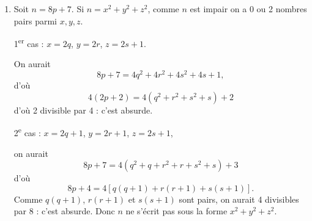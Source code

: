 \begin{enumerate}[label=\arabic*.,leftmargin=2.2em,itemsep=1.2em]
On considère
\[
u_n=1+\frac12+\frac13+\cdots+\frac1n
=\frac1{n!}\sum_{j=1}^{n}\frac{n!}{j}.
\]
On écrit chaque $j\le n$ sous la forme $j=A_j2^{\alpha_j}$, $A_j$ impair, et on écrit aussi $n!$ en $n!=A2^p$ avec $A$ impair. On a
\[
u_n=\frac1{A2^p}\sum_{j=1}^{n}\frac A{A_j}2^{p-\alpha_j}.
\]
Puis, pour $j\le n$, comme $j$ divise $n!$, c'est que $A_j$, impair, divise $A2^p$, donc que $A_j$ divise $A$ ; et pour $j=2^q$, on a $A_{2^q}=1$, (et $\alpha_{2^q}=q$). On isole ce terme, d'où
\[
u_n=\frac1{A2^p}
\left(
\sum_{\substack{1\le j\le n\\j\ne2^q}}\frac A{A_j}2^{p-\alpha_j}+A2^{p-q}
\right).
\]
On a justifié que, pour $j\le n$, avec $j\ne2^q$, $\alpha_j\le q-1$, donc $p-\alpha_j>p-q$ : on peut « simplifier » par $2^{p-q}$ l'expression de $u_n$ qui devient :
\[
u_n=\frac1{A2^q}
\left(
\sum_{\substack{1\le j\le n\\j\ne2^q}}\frac A{A_j}2^{q-\alpha_j}+A
\right).
\]
Comme $A/A_j$ est entier, que $q-\alpha_j\ge1$ pour $j\ne2^q$ et que $A$ est impair, l'entier
\[
\sum_{\substack{1\le j\le n\\j\ne2^q}}\frac A{A_j}2^{q-\alpha_j}+A
\]
est impair, si on le note $2a+1$, on a
\[
u_n=\frac{2a+1}{A2^q}
\]
avec $q\ge1$ car $n\ge2$, (j'ai bien cru ne pas utiliser cette hypothèse), et $2^q\le n<2^{q+1}$ implique bien $q\ge1$, mais alors $u_n$ n'est pas entier.

\item Soit $n=8p+7$. Si $n=x^2+y^2+z^2$, comme $n$ est impair on a 0 ou 2 nombres pairs parmi $x,y,z$.

1\textsuperscript{er} cas : $x=2q$, $y=2r$, $z=2s+1$.

On aurait
\[
8p+7=4q^2+4r^2+4s^2+4s+1,
\]
d'où
\[
4(2p+2)=4(q^2+r^2+s^2+s)+2
\]
d'où 2 divisible par 4 : c'est absurde.

2\textsuperscript{e} cas : $x=2q+1$, $y=2r+1$, $z=2s+1$,

on aurait
\[
8p+7=4(q^2+q+r^2+r+s^2+s)+3
\]
d'où
\[
8p+4=4[q(q+1)+r(r+1)+s(s+1)].
\]
Comme $q(q+1)$, $r(r+1)$ et $s(s+1)$ sont pairs, on aurait 4 divisibles par 8 : c'est absurde. Donc $n$ ne s'écrit pas sous la forme $x^2+y^2+z^2$.
\end{enumerate}
